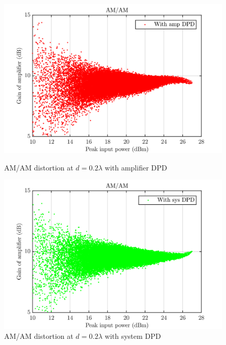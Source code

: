 \begin{figure}[H]
  \centering
  \begin{minipage}[b]{0.5\textwidth}
	\includegraphics[scale = 0.5]{figures/measurement/cree/meas3/amam_amp_dpd_0p2.png}
	\caption{AM/AM distortion at $d = 0.2\lambda$ with amplifier DPD}	
    \label{fig:meas3_amam3}
  \end{minipage}
  \hfill
  \begin{minipage}[b]{0.4\textwidth}
	\includegraphics[scale = 0.5]{figures/measurement/cree/meas3/amam_sys_dpd_0p2.png}
	\caption{AM/AM distortion at $d = 0.2\lambda$ with system DPD}
    \label{fig:meas3_amam4}
  \end{minipage}
\end{figure}

